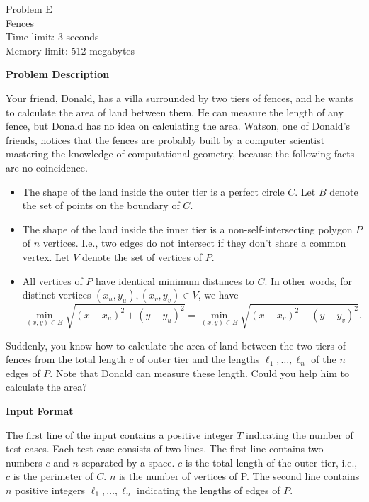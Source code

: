 \begin{center}
    {\LARGE Problem E}\vspace{1mm}\\
    {\Large Fences}\\
    {Time limit: 3 seconds}\\
    {Memory limit: 512 megabytes}
\end{center}

\textbf{\large Problem Description}

Your friend, Donald, has a villa surrounded by two tiers of fences, and he 
wants to calculate the area of land between them. He can measure the length 
of any fence, but Donald has no idea on calculating the area. 
Watson, one of Donald's friends, notices that the fences are probably built by 
a computer scientist mastering the knowledge of computational geometry, 
because the following facts are no coincidence.
\begin{itemize}
\item The shape of the land inside the outer tier is a perfect circle $C$. 
Let $B$ denote the set of points on the boundary of $C$.
\item The shape of the land inside the inner tier is a non-self-intersecting polygon $P$ of $n$ vertices. I.e., two edges do not intersect if they don't share a common vertex. Let $V$ denote the set of vertices of $P$. 
\item All vertices of $P$ have identical minimum distances to $C$. 
In other words, for distinct vertices $(x_u,y_u),(x_v,y_v)\in V$, 
we have 
$$\min_{(x,y)\in B}\sqrt{(x-x_u)^2+(y-y_u)^2}=\min_{(x,y)\in B}\sqrt{(x-x_v)^2+(y-y_v)^2}.$$
 
\end{itemize}
Suddenly, you know how to calculate the area of land between the two tiers 
of fences from the total length $c$ of outer tier and the lengths 
$\ell_1,\dots,\ell_n$ of the $n$ edges of $P$. Note that Donald can measure 
these length. Could you help him to calculate the area?

\textbf{\large Input Format}

The first line of the input contains a positive integer $T$ indicating the 
number of test cases. Each test case consists of two lines.
The first line contains two numbers $c$ and $n$ separated by a space. $c$ is 
the total length of the outer tier, i.e., $c$ is the perimeter of $C$. 
$n$ is the number of vertices of P. The second line contains $n$ positive 
integers $\ell_1,\dots,\ell_n$ indicating the lengths of 
edges of $P$. 

